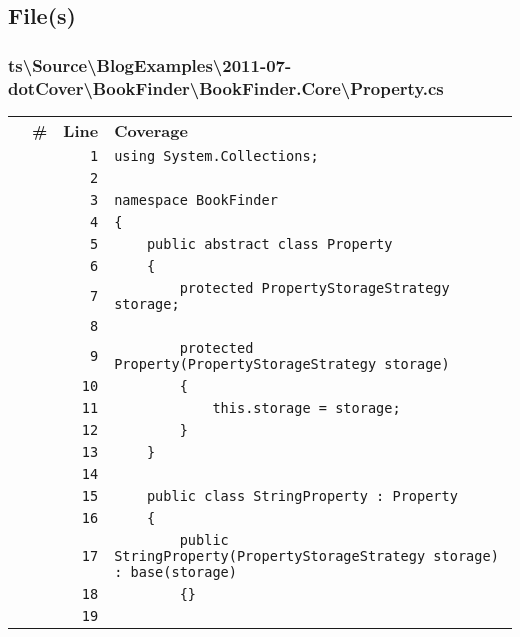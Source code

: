 \documentclass[a4paper,10pt]{article}
\begin{document}
\subsection{File(s)}
\subsubsection{ts\textbackslash Source\textbackslash BlogExamples\textbackslash 2011-07-dotCover\textbackslash BookFinder\textbackslash BookFinder.Core\textbackslash Property.cs}
\begin{longtable}[l]{lrrl}
\textbf{} & \textbf{\#} & \textbf{Line} & \textbf{Coverage}\\
\cellcolor{gray} &  & \verb~1~ & \verb~using System.Collections;~\\
\cellcolor{gray} &  & \verb~2~ & \verb~~\\
\cellcolor{gray} &  & \verb~3~ & \verb~namespace BookFinder~\\
\cellcolor{gray} &  & \verb~4~ & \verb~{~\\
\cellcolor{gray} &  & \verb~5~ & \verb~    public abstract class Property~\\
\cellcolor{gray} &  & \verb~6~ & \verb~    {~\\
\cellcolor{gray} &  & \verb~7~ & \verb~        protected PropertyStorageStrategy storage;~\\
\cellcolor{gray} &  & \verb~8~ & \verb~~\\
\cellcolor{gray} &  & \verb~9~ & \verb~        protected Property(PropertyStorageStrategy storage)~\\
\cellcolor{gray} &  & \verb~10~ & \verb~        {~\\
\cellcolor{gray} &  & \verb~11~ & \verb~            this.storage = storage;~\\
\cellcolor{gray} &  & \verb~12~ & \verb~        }~\\
\cellcolor{gray} &  & \verb~13~ & \verb~    }~\\
\cellcolor{gray} &  & \verb~14~ & \verb~~\\
\cellcolor{gray} &  & \verb~15~ & \verb~    public class StringProperty : Property~\\
\cellcolor{gray} &  & \verb~16~ & \verb~    {~\\
\cellcolor{gray} &  & \verb~17~ & \verb~        public StringProperty(PropertyStorageStrategy storage) : base(storage)~\\
\cellcolor{gray} &  & \verb~18~ & \verb~        {}~\\
\cellcolor{gray} &  & \verb~19~ & \verb~~\\

\end{longtable}
\end{document}
